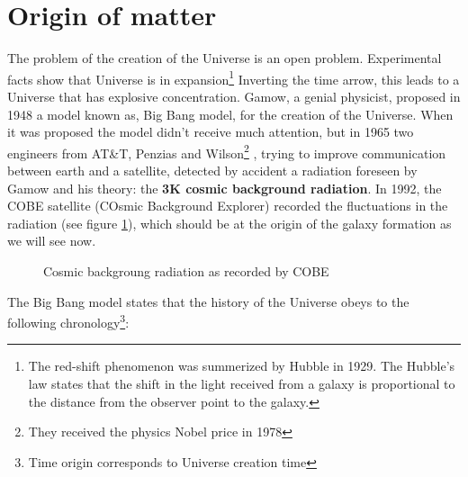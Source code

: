 \documentclass[12pt]{book}
\begin{document}
\section{Origin of matter}
The problem of the creation of the Universe is an open problem. 
Experimental facts show that Universe is in expansion\footnote{The red-shift
phenomenon was summerized by Hubble in 
1929. The Hubble's law states that the shift in the light received
from a galaxy is proportional to the distance from the observer point
to the galaxy.}
Inverting the time arrow, this leads to a Universe that has explosive
concentration. Gamow, a genial physicist, proposed in 1948 a model
known as, Big Bang model, for the creation of
the Universe. When it 
was proposed the model didn't receive much attention, but in 1965 two
engineers from AT\&T, Penzias and Wilson\footnote{They received the
physics Nobel price in 1978}%
, trying to improve communication between earth and
a satellite, detected by accident a radiation foreseen by Gamow and his
theory: the 
{\bf 3K cosmic background radiation}.
In 1992, the COBE
satellite (COsmic Background Explorer) recorded the fluctuations in
the radiation (see figure \ref{figcobe}), which should be at the
origin of the galaxy formation as we will see now. 
\begin{figure}[htb]
 \centerline{}   
 \caption{Cosmic backgroung radiation as recorded by COBE}
 \label{figcobe}
\end{figure}
The Big Bang model states that the history of the Universe obeys to
the following chronology\footnote{Time origin corresponds to Universe
creation time}: 
\end{document}
